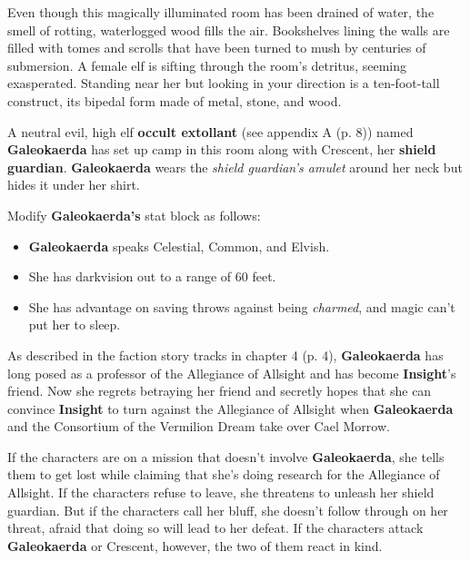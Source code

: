 \documentclass[letterpaper, 11pt, bg=full, twocolumn]{dndbook}
\begin{document}
\begin{DndReadAloud}
Even though this magically illuminated room has been drained of water, the smell of rotting, waterlogged wood fills the air. Bookshelves lining the walls are filled with tomes and scrolls that have been turned to mush by centuries of submersion.
A female elf is sifting through the room's detritus, seeming exasperated. Standing near her but looking in your direction is a ten-foot-tall construct, its bipedal form made of metal, stone, and wood.
\end{DndReadAloud}

A neutral evil, high elf \textbf{occult extollant} (see appendix A (p. 8)) named \textbf{Galeokaerda} has set up camp in this room along with Crescent, her \textbf{shield guardian}. \textbf{Galeokaerda} wears the \textit{shield guardian's amulet} around her neck but hides it under her shirt.

Modify \textbf{Galeokaerda's} stat block as follows:

\begin{itemize}
\item \textbf{Galeokaerda} speaks Celestial, Common, and Elvish.
\item She has darkvision out to a range of 60 feet.
\item She has advantage on saving throws against being \textit{charmed}, and magic can't put her to sleep.
\end{itemize}

As described in the faction story tracks in chapter 4 (p. 4), \textbf{Galeokaerda} has long posed as a professor of the Allegiance of Allsight and has become \textbf{Insight}'s friend. Now she regrets betraying her friend and secretly hopes that she can convince \textbf{Insight} to turn against the Allegiance of Allsight when \textbf{Galeokaerda} and the Consortium of the Vermilion Dream take over Cael Morrow.


If the characters are on a mission that doesn't involve \textbf{Galeokaerda}, she tells them to get lost while claiming that she's doing research for the Allegiance of Allsight. If the characters refuse to leave, she threatens to unleash her shield guardian. But if the characters call her bluff, she doesn't follow through on her threat, afraid that doing so will lead to her defeat. If the characters attack \textbf{Galeokaerda} or Crescent, however, the two of them react in kind.
\end{document}

